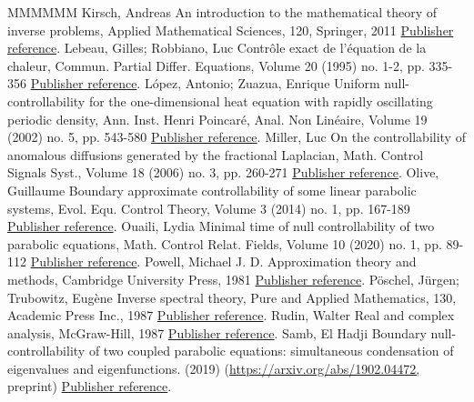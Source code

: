 \begin{thebibliography}{MMMMMM}
 Kirsch, Andreas An introduction to the mathematical theory of inverse problems, Applied Mathematical Sciences, 120, Springer, 2011 \href{https://ahl.centre-mersenne.org/item/AHL_2020__3__717_0/#KirschBook}{Publisher reference}.
 Lebeau, Gilles; Robbiano, Luc Contrôle exact de l’équation de la chaleur, Commun. Partial Differ. Equations, Volume 20 (1995) no. 1-2, pp. 335-356 \href{https://ahl.centre-mersenne.org/item/AHL_2020__3__717_0/#LebeauRobbiano95}{Publisher reference}.
 López, Antonio; Zuazua, Enrique Uniform null-controllability for the one-dimensional heat equation with rapidly oscillating periodic density, Ann. Inst. Henri Poincaré, Anal. Non Linéaire, Volume 19 (2002) no. 5, pp. 543-580 \href{https://ahl.centre-mersenne.org/item/AHL_2020__3__717_0/#LopezZuazua:2002}{Publisher reference}.
 Miller, Luc On the controllability of anomalous diffusions generated by the fractional Laplacian, Math. Control Signals Syst., Volume 18 (2006) no. 3, pp. 260-271 \href{https://ahl.centre-mersenne.org/item/AHL_2020__3__717_0/#Miller06}{Publisher reference}.
 Olive, Guillaume Boundary approximate controllability of some linear parabolic systems, Evol. Equ. Control Theory, Volume 3 (2014) no. 1, pp. 167-189 \href{https://ahl.centre-mersenne.org/item/AHL_2020__3__717_0/#Olive13}{Publisher reference}.
 Ouaili, Lydia Minimal time of null controllability of two parabolic equations, Math. Control Relat. Fields, Volume 10 (2020) no. 1, pp. 89-112 \href{https://ahl.centre-mersenne.org/item/AHL_2020__3__717_0/#Ouaili18}{Publisher reference}.
 Powell, Michael J. D. Approximation theory and methods, Cambridge University Press, 1981 \href{https://ahl.centre-mersenne.org/item/AHL_2020__3__717_0/#Powell_1981}{Publisher reference}.
 Pöschel, Jürgen; Trubowitz, Eugène Inverse spectral theory, Pure and Applied Mathematics, 130, Academic Press Inc., 1987 \href{https://ahl.centre-mersenne.org/item/AHL_2020__3__717_0/#PoeschelTrubowitz:1987}{Publisher reference}.
 Rudin, Walter Real and complex analysis, McGraw-Hill, 1987 \href{https://ahl.centre-mersenne.org/item/AHL_2020__3__717_0/#RudinAnalyseComplexe}{Publisher reference}.
 Samb, El Hadji Boundary null-controllability of two coupled parabolic equations: simultaneous condensation of eigenvalues and eigenfunctions. (2019) (\url{https://arxiv.org/abs/1902.04472,} preprint) \href{https://ahl.centre-mersenne.org/item/AHL_2020__3__717_0/#Samb18}{Publisher reference}.

\end{thebibliography}
